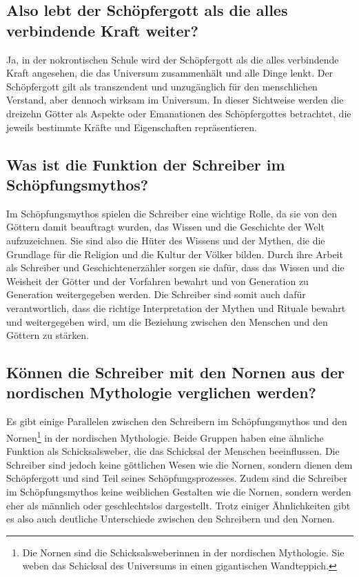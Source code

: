 \documentclass{article}
\begin{document}
\subsection*{Also lebt der Schöpfergott als die alles verbindende Kraft weiter?}
Ja, in der nokrontischen Schule wird der Schöpfergott als die alles verbindende Kraft angesehen, die das Universum zusammenhält und alle Dinge lenkt. Der Schöpfergott gilt als transzendent und unzugänglich für den menschlichen Verstand, aber dennoch wirksam im Universum. In dieser Sichtweise werden die dreizehn Götter als Aspekte oder Emanationen des Schöpfergottes betrachtet, die jeweils bestimmte Kräfte und Eigenschaften repräsentieren.
\subsection*{Was ist die Funktion der Schreiber im Schöpfungsmythos?}
Im Schöpfungsmythos spielen die Schreiber eine wichtige Rolle, da sie von den Göttern damit beauftragt wurden, das Wissen und die Geschichte der Welt aufzuzeichnen. Sie sind also die Hüter des Wissens und der Mythen, die die Grundlage für die Religion und die Kultur der Völker bilden. Durch ihre Arbeit als Schreiber und Geschichtenerzähler sorgen sie dafür, dass das Wissen und die Weisheit der Götter und der Vorfahren bewahrt und von Generation zu Generation weitergegeben werden. Die Schreiber sind somit auch dafür verantwortlich, dass die richtige Interpretation der Mythen und Rituale bewahrt und weitergegeben wird, um die Beziehung zwischen den Menschen und den Göttern zu stärken.
\subsection*{Können die Schreiber mit den Nornen aus der nordischen Mythologie verglichen werden?}
Es gibt einige Parallelen zwischen den Schreibern im Schöpfungsmythos und den Nornen\footnote{Die Nornen sind die Schicksalsweberinnen in der nordischen Mythologie. Sie weben das Schicksal des Universums in einen gigantischen Wandteppich.} in der nordischen Mythologie. Beide Gruppen haben eine ähnliche Funktion als Schicksalsweber, die das Schicksal der Menschen beeinflussen. Die Schreiber sind jedoch keine göttlichen Wesen wie die Nornen, sondern dienen dem Schöpfergott und sind Teil seines Schöpfungsprozesses. Zudem sind die Schreiber im Schöpfungsmythos keine weiblichen Gestalten wie die Nornen, sondern werden eher als männlich oder geschlechtslos dargestellt. Trotz einiger Ähnlichkeiten gibt es also auch deutliche Unterschiede zwischen den Schreibern und den Nornen.
\end{document}
